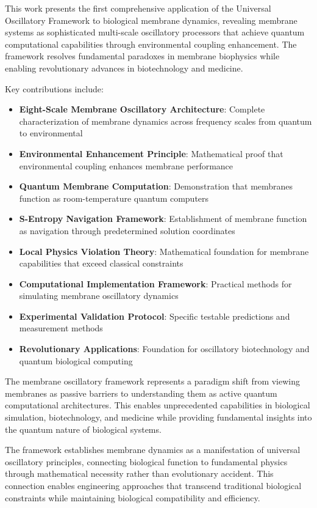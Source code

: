 \documentclass[12pt,a4paper]{article}
\begin{document}
This work presents the first comprehensive application of the Universal Oscillatory Framework to biological membrane dynamics, revealing membrane systems as sophisticated multi-scale oscillatory processors that achieve quantum computational capabilities through environmental coupling enhancement. The framework resolves fundamental paradoxes in membrane biophysics while enabling revolutionary advances in biotechnology and medicine.

Key contributions include:

\begin{itemize}
\item \textbf{Eight-Scale Membrane Oscillatory Architecture}: Complete characterization of membrane dynamics across frequency scales from quantum to environmental
\item \textbf{Environmental Enhancement Principle}: Mathematical proof that environmental coupling enhances membrane performance
\item \textbf{Quantum Membrane Computation}: Demonstration that membranes function as room-temperature quantum computers
\item \textbf{S-Entropy Navigation Framework}: Establishment of membrane function as navigation through predetermined solution coordinates
\item \textbf{Local Physics Violation Theory}: Mathematical foundation for membrane capabilities that exceed classical constraints
\item \textbf{Computational Implementation Framework}: Practical methods for simulating membrane oscillatory dynamics
\item \textbf{Experimental Validation Protocol}: Specific testable predictions and measurement methods
\item \textbf{Revolutionary Applications}: Foundation for oscillatory biotechnology and quantum biological computing
\end{itemize}

The membrane oscillatory framework represents a paradigm shift from viewing membranes as passive barriers to understanding them as active quantum computational architectures. This enables unprecedented capabilities in biological simulation, biotechnology, and medicine while providing fundamental insights into the quantum nature of biological systems.

The framework establishes membrane dynamics as a manifestation of universal oscillatory principles, connecting biological function to fundamental physics through mathematical necessity rather than evolutionary accident. This connection enables engineering approaches that transcend traditional biological constraints while maintaining biological compatibility and efficiency.
\end{document}
